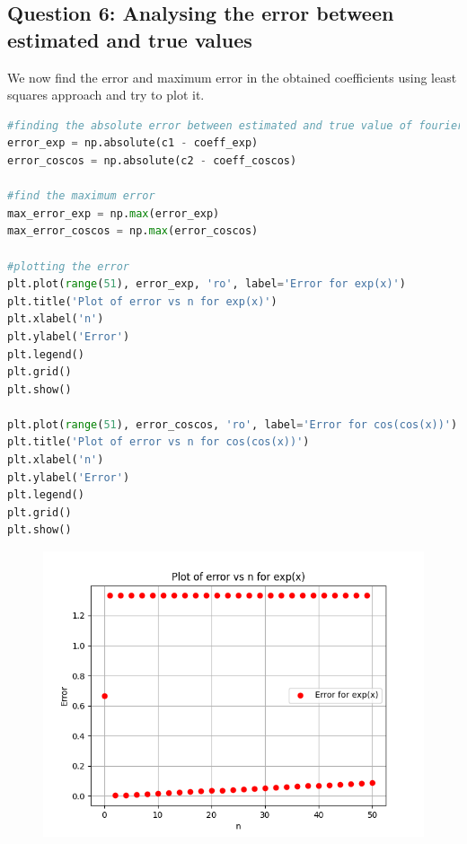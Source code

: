 \documentclass[11pt, a4paper]{article}
\begin{document}
\subsection{Question 6: Analysing the error between estimated and true values}
We now find the error and maximum error in the obtained coefficients using least squares approach and try to plot it. \\

\begin{lstlisting}[language = Python]
#finding the absolute error between estimated and true value of fourier coefficients
error_exp = np.absolute(c1 - coeff_exp)
error_coscos = np.absolute(c2 - coeff_coscos)

#find the maximum error
max_error_exp = np.max(error_exp)
max_error_coscos = np.max(error_coscos)

#plotting the error
plt.plot(range(51), error_exp, 'ro', label='Error for exp(x)')
plt.title('Plot of error vs n for exp(x)')
plt.xlabel('n')
plt.ylabel('Error')
plt.legend()
plt.grid()
plt.show()

plt.plot(range(51), error_coscos, 'ro', label='Error for cos(cos(x))')
plt.title('Plot of error vs n for cos(cos(x))')
plt.xlabel('n')
plt.ylabel('Error')
plt.legend()
plt.grid()
plt.show()
\end{lstlisting}

\begin{figure}[H]
     \centering
     \includegraphics[scale=0.8]{Figure_11.png}
\end{figure}
\end{document}
